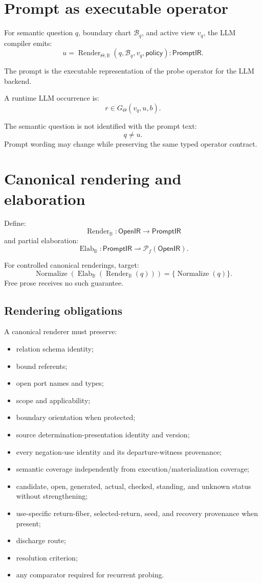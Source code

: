 \documentclass[11pt,oneside]{article}
\newcommand{\B}{\mathbb B}
\newcommand{\OpenIR}{\mathsf{OpenIR}}
\newcommand{\PromptIR}{\mathsf{PromptIR}}
\newcommand{\Render}{\operatorname{Render}}
\newcommand{\Elab}{\operatorname{Elab}}
\newcommand{\Normalize}{\operatorname{Normalize}}
\begin{document}
\section{Prompt as executable operator}

For semantic question \(q\), boundary chart \(\mathcal B_q\), and active view \(v_q\), the LLM compiler emits:
\[
\boxed{
u=
\Render_{\Theta,\B}(q,\mathcal B_q,v_q,\mathsf{policy})
:
\PromptIR.
}
\]

The prompt is the executable representation of the probe operator for the LLM backend.

A runtime LLM occurrence is:
\[
\boxed{
r
\in
G_\Theta(v_q,u,b).
}
\]

The semantic question is not identified with the prompt text:
\[
q\neq u.
\]
Prompt wording may change while preserving the same typed operator contract.

\section{Canonical rendering and elaboration}

Define:
\[
\Render_{\B}:
\OpenIR\to\PromptIR
\]
and partial elaboration:
\[
\Elab_{\B}:
\PromptIR\rightharpoonup\mathcal P_f(\OpenIR).
\]

For controlled canonical renderings, target:
\[
\boxed{
\Normalize(
\Elab_{\B}(\Render_{\B}(q))
)
=
\{\Normalize(q)\}.
}
\]
Free prose receives no such guarantee.

\subsection{Rendering obligations}

A canonical renderer must preserve:
\begin{itemize}
\item relation schema identity;
\item bound referents;
\item open port names and types;
\item scope and applicability;
\item boundary orientation when protected;
\item source determination-presentation identity and version;
\item every negation-use identity and its departure-witness provenance;
\item semantic coverage independently from execution/materialization coverage;
\item candidate, open, generated, actual, checked, standing, and unknown status without strengthening;
\item use-specific return-fiber, selected-return, seed, and recovery provenance when present;
\item discharge route;
\item resolution criterion;
\item any comparator required for recurrent probing.
\end{itemize}
\end{document}
